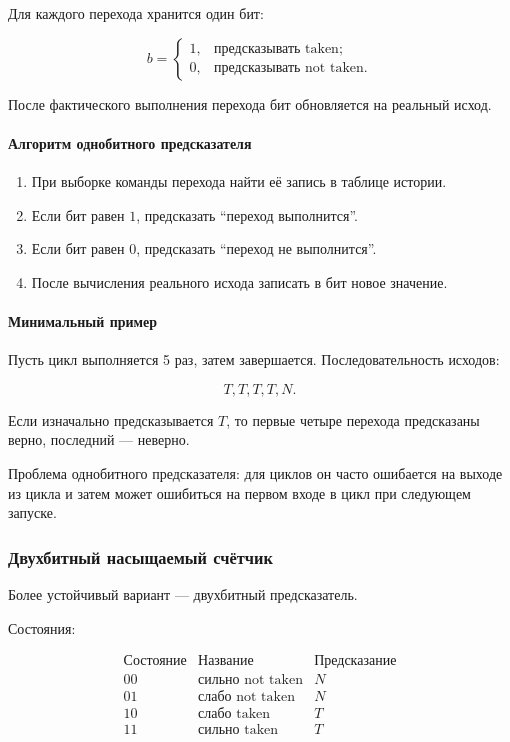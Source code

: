 \documentclass[12pt,a4paper]{article}
\begin{document}
Для каждого перехода хранится один бит:

\[
    b =
    \begin{cases}
    1, & \text{предсказывать taken};\\
    0, & \text{предсказывать not taken}.
    \end{cases}
\]

После фактического выполнения перехода бит обновляется на реальный исход.

\paragraph{Алгоритм однобитного предсказателя}

\begin{enumerate}
    \item При выборке команды перехода найти её запись в таблице истории.
    \item Если бит равен $1$, предсказать ``переход выполнится''.
    \item Если бит равен $0$, предсказать ``переход не выполнится''.
    \item После вычисления реального исхода записать в бит новое значение.
\end{enumerate}

\paragraph{Минимальный пример}

Пусть цикл выполняется 5 раз, затем завершается. Последовательность исходов:

\[
    T, T, T, T, N.
\]

Если изначально предсказывается $T$, то первые четыре перехода предсказаны верно, последний --- неверно.

Проблема однобитного предсказателя: для циклов он часто ошибается на выходе из цикла и затем может ошибиться на первом входе в цикл при следующем запуске.

\subsubsection{Двухбитный насыщаемый счётчик}

Более устойчивый вариант --- двухбитный предсказатель.

Состояния:

\[
\begin{array}{c|c|c}
\text{Состояние} & \text{Название} & \text{Предсказание} \\
\hline
00 & \text{сильно not taken} & N \\
01 & \text{слабо not taken} & N \\
10 & \text{слабо taken} & T \\
11 & \text{сильно taken} & T
\end{array}
\]
\end{document}
